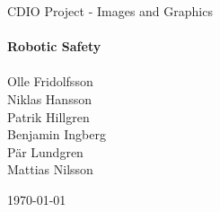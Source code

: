 \begin{titlepage}

\begin{center}   

{\Large CDIO Project - Images and Graphics }\\[1cm]

\HRule \\[0.4cm]%
{\huge \bfseries Robotic Safety}\\[0.4cm]
\HRule \\[1.3cm]%


{\large Olle Fridolfsson\\
		Niklas Hansson\\
		Patrik Hillgren\\		
		Benjamin Ingberg \\
		Pär Lundgren\\
		Mattias Nilsson\\
		}

\vfill

{\large \today}

\end{center}
\end{titlepage}
